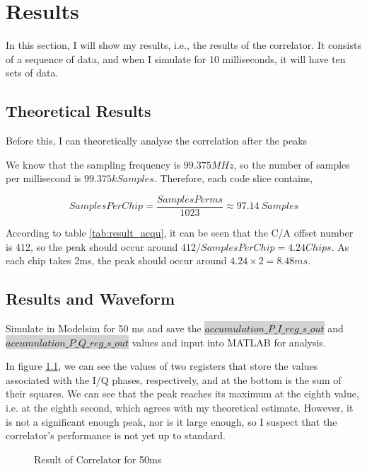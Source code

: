 \myClearDoublePage
\chapter{Results}
In this section, I will show my results, i.e., the results of the correlator. It consists of a sequence of data, and when I simulate for 10 milliseconds, it will have ten sets of data.

\section{Theoretical Results}
Before this, I can theoretically analyse the correlation after the peaks

We know that the sampling frequency is $99.375MHz$, so the number of samples per millisecond is $99.375k Samples$. Therefore, each code slice contains,

\begin{equation}
    SamplesPerChip=\frac{SamplesPerms}{1023} \approx 97.14\ Samples
\end{equation}

According to table \ref{tab:result_acqu}, it can be seen that the C/A offset number is 412, so the peak should occur around $412/SamplesPerChip=4.24Chips$. As each chip takes 2ms, the peak should occur around $4.24\times 2=8.48ms$.

\section{Results and Waveform}
\label{sec:results_waveform}
Simulate in Modelsim for 50 ms and save the \colorbox{lightgray}{$accumulation\_P\_I\_reg\_s\_out$} and\\ \colorbox{lightgray}{$accumulation\_P\_Q\_reg\_s\_out$} values and input into MATLAB for analysis.

In figure \ref{fig:result_50}, we can see the values of two registers that store the values associated with the I/Q phases, respectively, and at the bottom is the sum of their squares. We can see that the peak reaches its maximum at the eighth value, i.e. at the eighth second, which agrees with my theoretical estimate. However, it is not a significant enough peak, nor is it large enough, so I suspect that the correlator's performance is not yet up to standard.

\begin{figure}[!htbp]
    \centering
    
    \caption{Result of Correlator for 50ms}
    \label{fig:result_50}
\end{figure}
